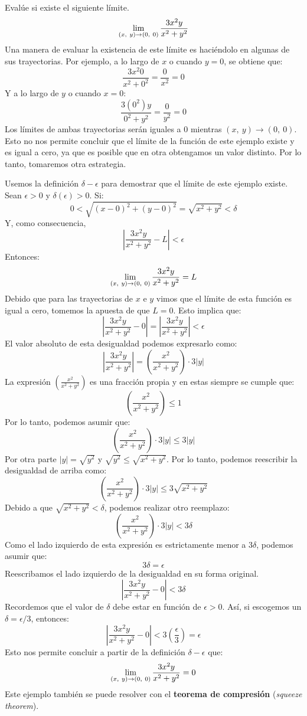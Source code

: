 \documentclass[12pt]{article}
\begin{document}
\ejemplo Evalúe si existe el siguiente límite.
\[
  \lim_{(x, \ y) \to (0, \ 0)} \frac{3x^{2}y}{x^{2} + y^{2}}
\]
\solucion Una manera de evaluar la existencia de este límite es haciéndolo en algunas de sus trayectorias. Por ejemplo, a lo largo de $x$ o cuando $y = 0$, se obtiene que:
\[
  \frac{3x^{2}0}{x^{2} + 0^{2}} = \frac{0}{x^{2}} = 0
\]
Y a lo largo de $y$ o cuando $x = 0$:
\[
  \frac{3(0^{2})y}{0^{2} + y^{2}} = \frac{0}{y^{2}} = 0
\]
Los límites de ambas trayectorias serán iguales a $0$ mientras $(x, \ y) \to (0, \ 0)$. Esto no nos permite concluir que el límite de la función de este ejemplo existe y es igual a cero, ya que es posible que en otra obtengamos un valor distinto. Por lo tanto, tomaremos otra estrategia.

Usemos la definición $\delta - \epsilon$ para demostrar que el límite de este ejemplo existe. Sean $\epsilon > 0$ y $\delta(\epsilon) > 0$. Si:
\[
0 < \sqrt{(x - 0)^{2} + (y - 0)^{2}} = \sqrt{x^{2} + y^{2}} < \delta
\]
Y, como consecuencia,
\[
  \left|\frac{3x^{2}y}{x^{2} + y^{2}} - L\right| < \epsilon
\]
Entonces:
\[
  \lim_{(x, \ y) \to (0, \ 0)} \frac{3x^{2}y}{x^{2} + y^{2}} = L
\]
Debido que para las trayectorias de $x$ e $y$ vimos que el límite de esta función es igual a cero, tomemos la apuesta de que $L = 0$. Esto implica que:
\[
  \left|\frac{3x^{2}y}{x^{2} + y^{2}} - 0\right| = \left|\frac{3x^{2}y}{x^{2} + y^{2}}\right| < \epsilon
\]
El valor absoluto de esta desigualdad podemos expresarlo como:
\[
  \left|\frac{3x^{2}y}{x^{2} + y^{2}}\right| = \left(\frac{x^{2}}{x^{2} + y^{2}}\right) \cdot 3|y|
\]
La expresión $\left(\frac{x^{2}}{x^{2} + y^{2}}\right)$ es una fracción propia y en estas siempre se cumple que:
\[
  \left(\frac{x^{2}}{x^{2} + y^{2}}\right) \leq 1
\]
Por lo tanto, podemos asumir que:
\[
  \left(\frac{x^{2}}{x^{2} + y^{2}}\right) \cdot 3|y| \leq 3|y|
\]
Por otra parte $|y| = \sqrt{y^{2}}$ y $\sqrt{y^{2}} \leq \sqrt{x^{2} + y^{2}}$. Por lo tanto, podemos reescribir la desigualdad de arriba como:
\[
  \left(\frac{x^{2}}{x^{2} + y^{2}}\right) \cdot 3|y| \leq 3 \sqrt{x^{2} + y^{2}}
\]
Debido a que $\sqrt{x^{2} + y^{2}} < \delta$, podemos realizar otro reemplazo:
\[
  \left(\frac{x^{2}}{x^{2} + y^{2}}\right) \cdot 3|y| < 3 \delta
\]
Como el lado izquierdo de esta expresión es estrictamente menor a $3 \delta$, podemos asumir que:
\[
  3 \delta = \epsilon
\]
Reescribamos el lado izquierdo de la desigualdad en su forma original.
\[
  \left|\frac{3x^{2}y}{x^{2} + y^{2}} - 0\right| < 3 \delta
\]
Recordemos que el valor de $\delta$ debe estar en función de $\epsilon > 0$. Así, si escogemos un $\delta = \epsilon/3$, entonces:
\[
  \left|\frac{3x^{2}y}{x^{2} + y^{2}} - 0\right| < 3 \left(\frac{\epsilon}{3}\right) = \epsilon
\]
Esto nos permite concluir a partir de la definición $\delta - \epsilon$ que:
\[
  \lim_{(x, \ y) \to (0, \ 0)} \frac{3x^{2}y}{x^{2} + y^{2}} = 0
\]
Este ejemplo también se puede resolver con el \textbf{teorema de compresión} (\textit{squeeze theorem}).
\end{document}
